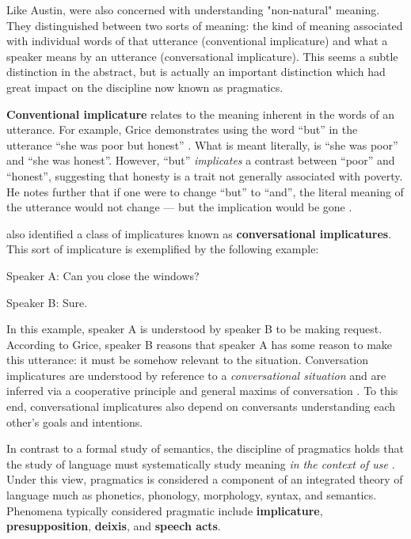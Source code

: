 \begin{sloppier}
Like Austin, \cite{Grice:1961ud} were also concerned with understanding "non-natural" meaning. They distinguished between two sorts of meaning: the kind of meaning associated with individual words of that utterance (conventional implicature) and what a speaker means by an utterance (conversational implicature). This seems a subtle distinction in the abstract, but is actually an important distinction which had great impact on the discipline now known as pragmatics.
\end{sloppier} 

\textbf{Conventional implicature} relates to the meaning inherent in the words of an utterance. For example, Grice demonstrates using the word ``but'' in the utterance ``she was poor but honest''  \cite[p. 127]{Grice:1961ud}.  What is meant literally, is ``she was poor'' and ``she was honest''. However, ``but'' \emph{implicates} a contrast between ``poor'' and ``honest'', suggesting that honesty is a trait not generally associated with poverty. He notes further that if one were to change ``but'' to ``and'', the literal meaning of the utterance would not change --- but the implication would be gone  \cite[p. 129]{Grice:1961ud}.  

 \cite{Grice:1975vw}  also identified a class of implicatures known as \textbf{conversational implicatures}. This sort of implicature is exemplified by the following example:

\begin{description}
\item Speaker A: Can you close the windows?
\item Speaker B: Sure.
\end{description}

In this example, speaker A is understood by speaker B to be making request. According to Grice, speaker B reasons that speaker A has some reason to make this utterance: it must be somehow relevant to the situation. Conversation implicatures are understood by reference to a \emph{conversational situation} and are inferred via a cooperative principle and general maxims of conversation  \cite[p. 46; covered in more depth later in this chapter]{Grice:1975vw}.  To this end, conversational implicatures also depend on conversants understanding each other's goals and intentions.

In contrast to a formal study of semantics, the discipline of pragmatics holds that the study of language must systematically study meaning \emph{in the context of use}  \citep{Huang:2007ww}.  Under this view, pragmatics is considered a component of an integrated theory of language much as phonetics, phonology, morphology, syntax, and semantics. Phenomena typically considered pragmatic include \textbf{implicature}, \textbf{presupposition}, \textbf{deixis}, and \textbf{speech acts}. 


